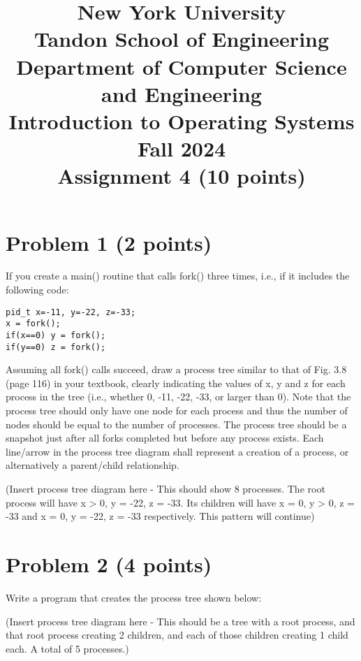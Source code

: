 \documentclass{article}
\begin{document}
\title{New York University \\ Tandon School of Engineering \\ Department of Computer Science and Engineering \\ Introduction to Operating Systems \\ Fall 2024 \\ Assignment 4 (10 points)}
\date{}
\maketitle

\section*{Problem 1 (2 points)}

If you create a main() routine that calls fork() three times, i.e., if it includes the following code:

\texttt{pid\_t x=-11, y=-22, z=-33; \\
x = fork(); \\
if(x==0) y = fork(); \\
if(y==0) z = fork();
}

Assuming all fork() calls succeed, draw a process tree similar to that of Fig. 3.8 (page 116) in your textbook, clearly indicating the values of x, y and z for each process in the tree (i.e., whether 0, -11, -22, -33, or larger than 0).  Note that the process tree should only have one node for each process and thus the number of nodes should be equal to the number of processes. The process tree should be a snapshot just after all forks completed but before any process exists. Each line/arrow in the process tree diagram shall represent a creation of a process, or alternatively a parent/child relationship.

(Insert process tree diagram here -  This should show 8 processes.  The root process will have x > 0, y = -22, z = -33.  Its children will have x = 0,  y > 0, z = -33 and x = 0, y = -22, z = -33 respectively. This pattern will continue)


\section*{Problem 2 (4 points)}

Write a program that creates the process tree shown below:

(Insert process tree diagram here - This should be a tree with a root process, and that root process creating 2 children, and each of those children creating 1 child each. A total of 5 processes.)
\end{document}
